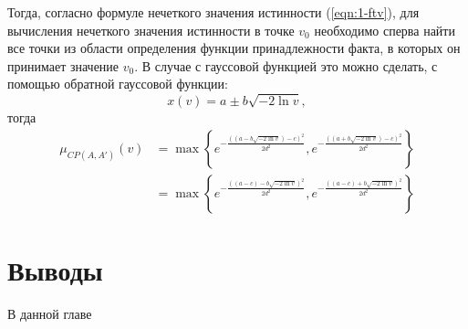 Тогда, согласно формуле нечеткого значения истинности (\ref{eqn:1-ftv}), для вычисления нечеткого значения истинности в точке $v_0$ необходимо сперва найти все точки из области определения функции принадлежности факта, в которых он принимает значение $v_0$. В случае с гауссовой функцией это можно сделать, с помощью обратной гауссовой функции:
\begin{equation*}
x(v) = a \pm b\sqrt{-2\ln{v}},
\end{equation*}
тогда
\begin{align}
\mu_{CP(A, A')}(v) &= \max\left\{e^{-\frac{((a - b\sqrt{-2\ln v})-c)^2}{2 d^2}},e^{-\frac{((a + b\sqrt{-2\ln v})-c)^2}{2 d^2}}\right\} \nonumber \\
&= \max\left\{e^{-\frac{((a-c) - b\sqrt{-2\ln v})^2}{2 d^2}},e^{-\frac{((a-c) + b\sqrt{-2\ln v})^2}{2 d^2}}\right\} \label{eqn:ftv-gauss-expanded}
\end{align}

%
%
%

\section{Выводы}

В данной главе 

\FloatBarrier
